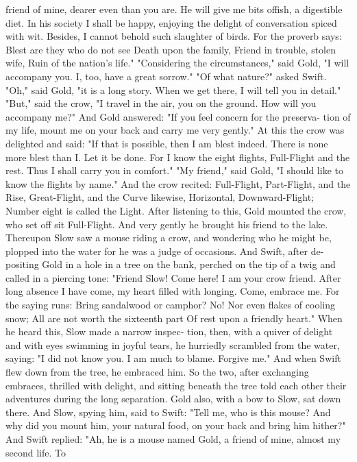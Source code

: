 \documentclass{book}
\begin{document}
friend of mine, dearer even than you are. He will give
me bits offish, a digestible diet. In his society I shall
be happy, enjoying the delight of conversation spiced
with wit. Besides, I cannot behold such slaughter of
birds. For the proverb says:
Blest are they who do not see
Death upon the family,
Friend in trouble, stolen wife,
Ruin of the nation's life."
"Considering the circumstances," said Gold, "I
will accompany you. I, too, have a great sorrow."
"Of what nature?" asked Swift. "Oh," said Gold, "it
is a long story. When we get there, I will tell you in
detail."
"But," said the crow, "I travel in the air, you on
the ground. How will you accompany me?" And
Gold answered: "If you feel concern for the preserva-
tion of my life, mount me on your back and carry me
very gently."
At this the crow was delighted and said: "If that
is possible, then I am blest indeed. There is none
more blest than I. Let it be done. For I know the
eight flights, Full-Flight and the rest. Thus I shall
carry you in comfort."
"My friend," said Gold, "I should like to know
the flights by name." And the crow recited:
Full-Flight, Part-Flight, and the Rise,
Great-Flight, and the Curve likewise,
Horizontal, Downward-Flight;
Number eight is called the Light.
After listening to this, Gold mounted the crow,
who set off sit Full-Flight. And very gently he
brought his friend to the lake.
Thereupon Slow saw a mouse riding a crow, and
wondering who he might be, plopped into the water
for he was a judge of occasions. And Swift, after de-
positing Gold in a hole in a tree on the bank, perched
on the tip of a twig and called in a piercing tone:
"Friend Slow! Come here! I am your crow friend.
After long absence I have come, my heart filled with
longing. Come, embrace me. For the saying runs:
Bring sandalwood or camphor? No!
Nor even flakes of cooling snow;
All are not worth the sixteenth part
Of rest upon a friendly heart."
When he heard this, Slow made a narrow inspec-
tion, then, with a quiver of delight and with eyes
swimming in joyful tears, he hurriedly scrambled
from the water, saying: "I did not know you. I am
much to blame. Forgive me." And when Swift flew
down from the tree, he embraced him.
So the two, after exchanging embraces, thrilled
with delight, and sitting beneath the tree told each
other their adventures during the long separation.
Gold also, with a bow to Slow, sat down there. And
Slow, spying him, said to Swift: "Tell me, who is this
mouse? And why did you mount him, your natural
food, on your back and bring him hither?"
And Swift replied: "Ah, he is a mouse named
Gold, a friend of mine, almost my second life. To
\end{document}
